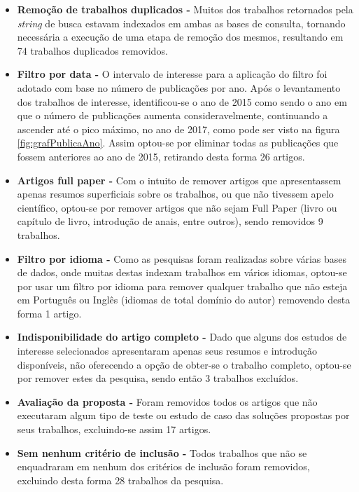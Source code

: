 \documentclass[ti,table]{texufpel} %
\begin{document}
\begin{itemize} 

\item  \textbf{Remoção de trabalhos duplicados - } Muitos dos trabalhos retornados pela \textit{string} de busca estavam indexados em ambas as bases de consulta, tornando necessária a execução de uma etapa de remoção dos mesmos, resultando em 74 trabalhos duplicados removidos. 

  

\item  \textbf{Filtro por data - } O intervalo de interesse para a aplicação do filtro foi adotado com base no número de publicações por ano. Após o levantamento dos trabalhos de interesse, identificou-se o ano de 2015 como sendo o ano em que o número de publicações aumenta consideravelmente, continuando a ascender até o pico máximo, no ano de 2017, como pode ser visto na figura \ref{fig:grafPublicaAno}. Assim optou-se por eliminar todas as publicações que fossem anteriores ao ano de 2015, retirando desta forma 26 artigos.     

  

\item  \textbf{Artigos full paper - } Com o intuito de remover artigos que apresentassem apenas resumos superficiais sobre os trabalhos, ou que não tivessem apelo científico, optou-se por remover artigos que não sejam Full Paper (livro ou capítulo de livro, introdução de anais, entre outros), sendo removidos 9 trabalhos. 

  

\item  \textbf{Filtro por idioma - } Como as pesquisas foram realizadas sobre várias bases de dados, onde muitas destas indexam trabalhos em vários idiomas, optou-se por usar um filtro por idioma para remover qualquer trabalho que não esteja em Português ou Inglês (idiomas de total domínio do autor) removendo desta forma 1 artigo. 

  

\item  \textbf{Indisponibilidade do artigo completo - } Dado que alguns dos estudos de interesse selecionados apresentaram apenas seus resumos e introdução disponíveis, não oferecendo a opção de obter-se o trabalho completo, optou-se por remover estes da pesquisa, sendo então 3 trabalhos excluídos. 

  

\item  \textbf{Avaliação da proposta - } Foram removidos todos os artigos que não executaram algum tipo de teste ou estudo de caso das soluções propostas por seus trabalhos, excluindo-se assim 17 artigos. 

  

\item  \textbf{Sem nenhum critério de inclusão - } Todos trabalhos que não  se enquadraram em nenhum dos critérios de inclusão foram removidos, excluindo desta forma 28 trabalhos da pesquisa. 

     

  

\end{itemize} 
\end{document}
